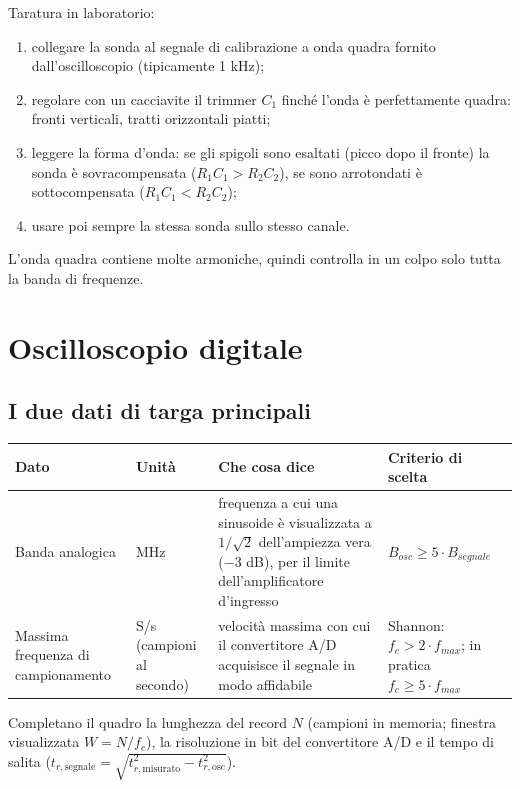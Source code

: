 \documentclass[11pt,a4paper]{article}
\begin{document}
Taratura in laboratorio:
\begin{enumerate}
\item collegare la sonda al segnale di calibrazione a onda quadra fornito dall'oscilloscopio (tipicamente 1 kHz);
\item regolare con un cacciavite il trimmer $C_1$ finché l'onda è perfettamente quadra: fronti verticali, tratti orizzontali piatti;
\item leggere la forma d'onda: se gli spigoli sono esaltati (picco dopo il fronte) la sonda è sovracompensata ($R_1C_1 > R_2C_2$), se sono arrotondati è sottocompensata ($R_1C_1 < R_2C_2$);
\item usare poi sempre la stessa sonda sullo stesso canale.
\end{enumerate}
L'onda quadra contiene molte armoniche, quindi controlla in un colpo solo tutta la banda di frequenze.

\section*{Oscilloscopio digitale}

\subsection*{I due dati di targa principali}

\begin{center}
\begin{tabularx}{\linewidth}{>{\raggedright\arraybackslash}p{2.6cm} >{\raggedright\arraybackslash}p{1.8cm} L >{\raggedright\arraybackslash}p{3.2cm}}
\toprule
\textbf{Dato} & \textbf{Unità} & \textbf{Che cosa dice} & \textbf{Criterio di scelta}\\
\midrule
Banda analogica & MHz & frequenza a cui una sinusoide è visualizzata a $1/\sqrt{2}$ dell'ampiezza vera ($-3$ dB), per il limite dell'amplificatore d'ingresso & $B_{osc} \ge 5\cdot B_{segnale}$\\
Massima frequenza di campionamento & S/s (campioni al secondo) & velocità massima con cui il convertitore A/D acquisisce il segnale in modo affidabile & Shannon: $f_c > 2\cdot f_{max}$; in pratica $f_c \ge 5\cdot f_{max}$\\
\bottomrule
\end{tabularx}
\end{center}

Completano il quadro la lunghezza del record $N$ (campioni in memoria; finestra visualizzata $W = N/f_c$), la risoluzione in bit del convertitore A/D e il tempo di salita ($t_{r,\text{segnale}} = \sqrt{t_{r,\text{misurato}}^2 - t_{r,\text{osc}}^2}$).
\end{document}
